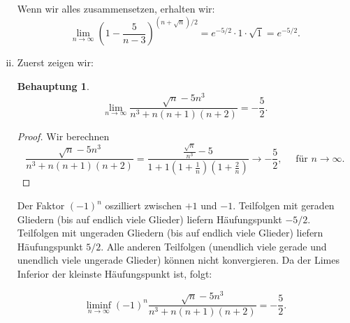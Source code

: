 \documentclass[a4paper, 20]{exam}
\newtheorem{claim}{Behauptung}
\begin{document}
\begin{solution}
\begin{enumerate}[i.)]
Wenn wir alles zusammensetzen, erhalten wir:
$$ \lim_{n \rightarrow \infty} \left( 1 - \frac{5}{n-3} \right)^{(n+\sqrt{n})/2}
= e^{-5/2} \cdot 1 \cdot \sqrt{1} = e^{-5/2}.$$
\item
Zuerst zeigen wir:
\begin{claim}
$$ \lim_{n\rightarrow \infty} \frac{\sqrt{n}-5n^3}{n^3 + n(n+1)(n+2)}= -\frac{5}{2}.$$
\end{claim}
\begin{proof}
Wir berechnen
$$\frac{\sqrt{n}-5n^3}{n^3 + n(n+1)(n+2)}
= \frac{\frac{\sqrt{n}}{n^3}-5}{1 + 1 (1+\frac{1}{n})(1+\frac{2}{n})} 
\longrightarrow -\frac{5}{2}, \quad \text{ f\"ur } n \longrightarrow \infty.$$
\end{proof}
Der Faktor $(-1)^n$ oszilliert zwischen $+1$ und $-1$. Teilfolgen mit geraden Gliedern (bis auf endlich viele Glieder) liefern H\"aufungspunkt $-5/2$. Teilfolgen mit ungeraden Gliedern (bis auf endlich viele Glieder) liefern H\"aufungspunkt $5/2$. Alle anderen Teilfolgen (unendlich viele gerade und unendlich viele ungerade Glieder) k\"onnen nicht konvergieren. Da der Limes Inferior der kleinste H\"aufungspunkt ist, folgt:

$$ \liminf_{n \rightarrow \infty} (-1)^n \frac{\sqrt{n}-5n^3}{n^3 + n(n+1)(n+2)} = - \frac{5}{2}.$$

\end{enumerate}
\end{solution}
\end{document}
